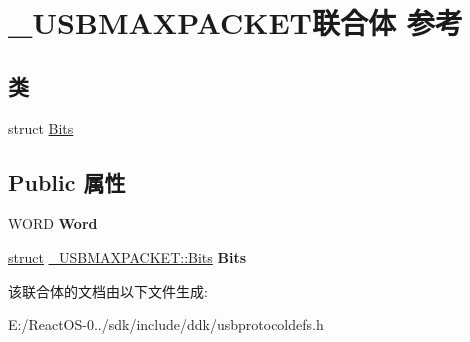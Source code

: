\hypertarget{union___u_s_b_m_a_x_p_a_c_k_e_t}{}\section{\+\_\+\+U\+S\+B\+M\+A\+X\+P\+A\+C\+K\+E\+T联合体 参考}
\label{union___u_s_b_m_a_x_p_a_c_k_e_t}
\subsection*{类}
\begin{DoxyCompactItemize}
\item 
struct \hyperlink{struct___u_s_b_m_a_x_p_a_c_k_e_t_1_1_bits}{Bits}
\end{DoxyCompactItemize}
\subsection*{Public 属性}
\begin{DoxyCompactItemize}
\item 
\mbox{\label{union___u_s_b_m_a_x_p_a_c_k_e_t_ac2d3f9b7ceadfbfc45922c3b7e6151f7}} 
W\+O\+RD {\bfseries Word}
\item 
\mbox{\label{union___u_s_b_m_a_x_p_a_c_k_e_t_a0116e847cd76cfde212ccbee1494cbc8}} 
\hyperlink{interfacestruct}{struct} \hyperlink{struct___u_s_b_m_a_x_p_a_c_k_e_t_1_1_bits}{\+\_\+\+U\+S\+B\+M\+A\+X\+P\+A\+C\+K\+E\+T\+::\+Bits} {\bfseries Bits}
\end{DoxyCompactItemize}


该联合体的文档由以下文件生成\+:\begin{DoxyCompactItemize}
\item 
E\+:/\+React\+O\+S-\/0../sdk/include/ddk/usbprotocoldefs.\+h\end{DoxyCompactItemize}
